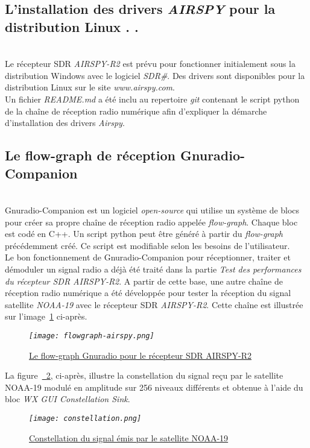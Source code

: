 \documentclass[12pt,fleqn]{book} %
\begin{document}
\subsection{L'installation des drivers \emph{AIRSPY} pour la distribution Linux   \color{white}. .}
~\\\indent Le récepteur SDR \emph{AIRSPY-R2} est prévu pour fonctionner initialement sous la distribution Windows avec le logiciel \emph{SDR\#}. Des drivers sont disponibles pour la distribution Linux sur le site \emph{www.airspy.com}. 
~\\Un fichier \emph{README.md} a été inclu au repertoire \emph{git} contenant le script python de la chaîne de réception radio numérique afin d'expliquer la démarche d'installation des drivers \emph{Airspy}.
\subsection{Le flow-graph de réception Gnuradio-Companion}
~\\\indent Gnuradio-Companion est un logiciel \emph{open-source} qui utilise un système de blocs pour créer sa propre chaîne de réception radio appelée \emph{flow-graph}. Chaque bloc est codé en C++. Un script python peut être généré à partir du \emph{flow-graph} précédemment créé. Ce script est modifiable selon les besoins de l'utilisateur.
~\\Le bon fonctionnement de Gnuradio-Companion pour réceptionner, traiter et démoduler un signal radio a déjà été traité dans la partie \emph{Test des performances du récepteur SDR AIRSPY-R2}. A partir de cette base, une autre chaîne de réception radio numérique a été développée pour tester la réception du signal satellite \emph{NOAA-19} avec le récepteur SDR \emph{AIRSPY-R2}. Cette chaîne est illustrée sur l'image~\underline{\color{blue}\ref{flowgraph-airspy}} ci-après.
\begin{figure}[H]
	\centering
	\itshape
	\texttt{[image: flowgraph-airspy.png]}
	\caption{\label{flowgraph-airspy} \underline{Le flow-graph Gnuradio pour le récepteur SDR AIRSPY-R2}}
\end{figure}
La figure~\underline{\color{blue}~\ref{constellation}}, ci-après, illustre la constellation du signal reçu par le satellite NOAA-19 modulé en amplitude sur 256 niveaux différents et obtenue à l'aide du bloc \emph{WX GUI Constellation Sink}.
\begin{figure}[H]
	\centering
	\itshape
	\texttt{[image: constellation.png]}
	\caption{\label{constellation} \underline{Constellation du signal émis par le satellite NOAA-19}}
\end{figure}
\end{document}
